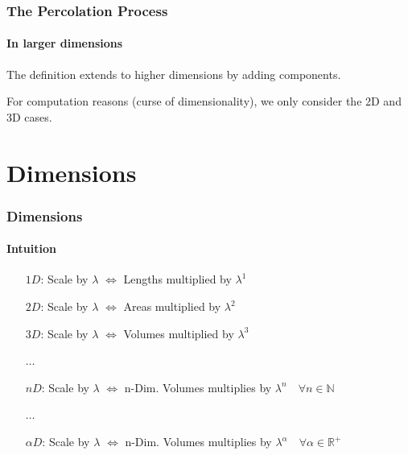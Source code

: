 \documentclass{beamer}
\newcommand{\N}{\mathbb{N}}
\newcommand{\R}{\mathbb{R}}
\begin{document}
	\begin{frame}
		\frametitle{The Percolation Process}
		\framesubtitle{In larger dimensions}
		The definition extends to higher dimensions by adding components.
		
		For computation reasons (curse of dimensionality), we only consider the 2D and 3D cases.
	\end{frame}
	
	
	\section{Dimensions}
	\begin{frame}
		\frametitle{Dimensions}
		\framesubtitle{Intuition}
		\begin{itemize}
			\pause
			\item[$1D$:] Scale by $\lambda$ $\iff$ Lengths multiplied by $\lambda^1$
			\pause
			\item[$2D$:] Scale by $\lambda$ $\iff$ Areas multiplied by $\lambda^2$
			\pause
			\item[$3D$:] Scale by $\lambda$ $\iff$ Volumes multiplied by $\lambda^3$
			\pause
			\item[$\dots$]
			\item[$nD$:] Scale by $\lambda$ $\iff$ n-Dim. Volumes multiplies by $\lambda^n \quad \forall n \in \N$
			\pause
			\item[\color{purple} $\dots$]
			\item[\color{red} $\alpha D$:] \color{brickred} Scale by $\lambda$ $\iff$ n-Dim. Volumes multiplies by $\lambda^{\alpha} \quad \forall \alpha \in \R^+$
		\end{itemize}
	\end{frame}
\end{document}
